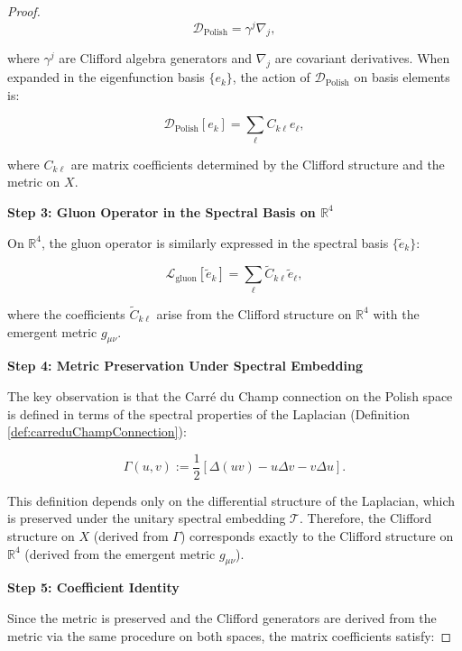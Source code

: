 \begin{theorem}
\begin{proof}
\begin{equation}
\mathcal{D}_{\mathrm{Polish}} = \gamma^j \nabla_j,
\end{equation}

where $\gamma^j$ are Clifford algebra generators and $\nabla_j$ are covariant derivatives. When expanded in the eigenfunction basis $\{e_k\}$, the action of $\mathcal{D}_{\mathrm{Polish}}$ on basis elements is:

\begin{equation}
\mathcal{D}_{\mathrm{Polish}}[e_k] = \sum_{\ell} C_{k\ell} e_\ell,
\end{equation}

where $C_{k\ell}$ are matrix coefficients determined by the Clifford structure and the metric on $X$.

\textbf{Step 3: Gluon Operator in the Spectral Basis on $\mathbb{R}^4$}

On $\mathbb{R}^4$, the gluon operator is similarly expressed in the spectral basis $\{\tilde{e}_k\}$:

\begin{equation}
\mathcal{L}_{\mathrm{gluon}}[\tilde{e}_k] = \sum_{\ell} \tilde{C}_{k\ell} \tilde{e}_\ell,
\end{equation}

where the coefficients $\tilde{C}_{k\ell}$ arise from the Clifford structure on $\mathbb{R}^4$ with the emergent metric $g_{\mu\nu}$.

\textbf{Step 4: Metric Preservation Under Spectral Embedding}

The key observation is that the Carré du Champ connection on the Polish space is defined in terms of the spectral properties of the Laplacian (Definition \ref{def:carreduChampConnection}):

\begin{equation}
\Gamma(u, v) := \frac{1}{2}[\Delta(uv) - u\Delta v - v\Delta u].
\end{equation}

This definition depends only on the differential structure of the Laplacian, which is preserved under the unitary spectral embedding $\mathcal{T}$. Therefore, the Clifford structure on $X$ (derived from $\Gamma$) corresponds exactly to the Clifford structure on $\mathbb{R}^4$ (derived from the emergent metric $g_{\mu\nu}$).

\textbf{Step 5: Coefficient Identity}

Since the metric is preserved and the Clifford generators are derived from the metric via the same procedure on both spaces, the matrix coefficients satisfy:


\end{proof}
\end{theorem}
